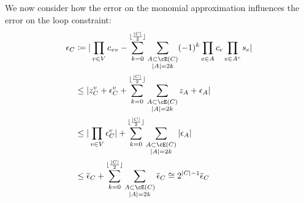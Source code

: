 \documentclass{article}
\begin{document}
  We now consider how the error on the monomial approximation influences the error on the loop constraint:
\begin{align}
	\epsilon_C &\coloneqq | \prod_{v \in V}c_{vv}- \sum_{k=0}^{\lfloor\frac{|C|}{2}\rfloor}\sum_{\substack{A \subset \cE(C) \\ |A| = 2k}}(-1)^k\prod_{e \in A}c_{e}\prod_{e \in A^c}s_e|\\
	& \leq  |z^v_C + \epsilon^v_{C}+ \sum_{k=0}^{\lfloor\frac{|C|}{2}\rfloor}\sum_{\substack{A \subset \cE(C) \\ |A| = 2k}}z_A + \epsilon_A|\\
	& \leq  |\prod_{v \in V}\epsilon^v_{C}|+ \sum_{k=0}^{\lfloor\frac{|C|}{2}\rfloor}\sum_{\substack{A \subset \cE(C) \\ |A| = 2k}}|\epsilon_A| \\
	& \leq \overline{\epsilon}_C + \sum_{k=0}^{\lfloor\frac{|C|}{2}\rfloor}\sum_{\substack{A \subset \cE(C) \\ |A| = 2k}}\overline{\epsilon}_C \cong 2^{|C|-1}\overline{\epsilon}_C
\end{align}
\end{document}
